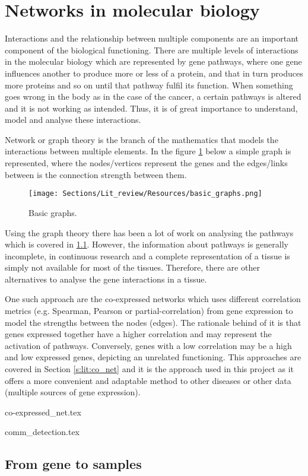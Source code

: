 \section{Networks in molecular biology}

Interactions and the relationship between multiple components are an important component of the biological functioning. There are multiple levels of interactions in the molecular biology which are represented by gene pathways, where one gene influences another to produce more or less of a protein, and that in turn produces more proteins and so on until that pathway fulfil its function. When something goes wrong in the body as in the case of the cancer, a certain pathways is altered and it is not working as intended. Thus, it is of great importance to understand, model and analyse these interactions.

Network or graph theory is the branch of the mathematics that models the interactions between multiple elements. In the figure \ref{fig:lit:basic_net} below a simple graph is represented, where the nodes/vertices represent the genes and the edges/links between is the connection strength between them. 

\begin{figure}[!htb]
  \centering\texttt{[image: Sections/Lit\_review/Resources/basic\_graphs.png]}
    \caption{Basic graphs.}
    \label{fig:lit:basic_net}
\end{figure}
\FloatBarrier

Using the graph theory there has been a lot of work on analysing the pathways which is covered in \ref{}. However, the information about pathways is generally incomplete, in continuous research and a complete representation of a tissue is simply not available for most of the tissues. Therefore, there are other alternatives to analyse the gene interactions in a tissue.

One such approach are the co-expressed networks which uses different correlation metrics (e.g. Spearman, Pearson or partial-correlation) from gene expression to model the strengths between the nodes (edges). The rationale behind of it is that genes expressed together have a higher correlation and may represent the activation of pathways. Conversely, genes with a low correlation may be a high and low expressed genes, depicting an unrelated functioning. This approaches are covered in Section \ref{s:lit:co_net} and it is the approach used in this project as it offers a more convenient and adaptable method to other diseases or other data (multiple sources of gene expression).

{co-expressed_net.tex}

{comm_detection.tex}


\subsection{From gene to samples}


